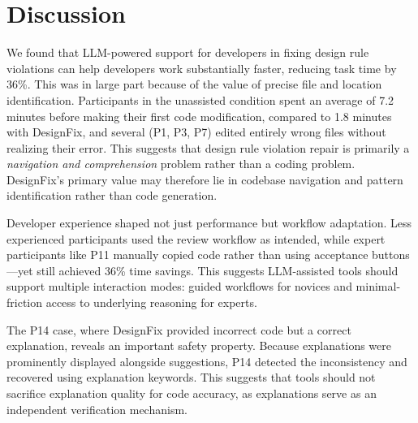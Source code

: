 \documentclass[conference]{IEEEtran}
\begin{document}
\section{Discussion}
We found that LLM-powered support for developers in fixing design rule violations can help developers work substantially faster, reducing task time by 36\%. 
This was in large part because of the value of precise file and location identification. Participants in the unassisted condition spent an average of 7.2 minutes before making their first code modification, compared to 1.8 minutes with DesignFix, and several (P1, P3, P7) edited entirely wrong files without realizing their error. This suggests that design rule violation repair is primarily a \textit{navigation and comprehension} problem rather than a coding problem. DesignFix's primary value may therefore lie in codebase navigation and pattern identification rather than code generation.


Developer experience shaped not just performance but workflow adaptation. Less experienced participants used the review workflow as intended, while expert participants like P11 manually copied code rather than using acceptance buttons---yet still achieved 36\% time savings. This suggests LLM-assisted tools should support multiple interaction modes: guided workflows for novices and minimal-friction access to underlying reasoning for experts.


The P14 case, where DesignFix provided incorrect code but a correct explanation, reveals an important safety property. Because explanations were prominently displayed alongside suggestions, P14 detected the inconsistency and recovered using explanation keywords. This suggests that tools should not sacrifice explanation quality for code accuracy, as explanations serve as an independent verification mechanism.
\end{document}
